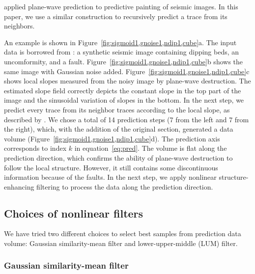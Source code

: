 \cite{Fomel08a} applied plane-wave prediction to predictive painting 
of seismic images. In this paper, we use a similar construction to
recursively predict a trace from its neighbors.

An example is shown in Figure~\ref{fig:sigmoid1,gnoise1,ndip1,cube}a.
The input data is borrowed from \cite{Claerbout08a}: a synthetic
seismic image containing dipping beds, an uncomformity, and a
fault. Figure~\ref{fig:sigmoid1,gnoise1,ndip1,cube}b shows the same
image with Gaussian noise
added. Figure~\ref{fig:sigmoid1,gnoise1,ndip1,cube}c shows local
slopes measured from the noisy image by plane-wave destruction. The
estimated slope field correctly depicts the constant slope in the top
part of the image and the sinusoidal variation of slopes in the
bottom. In the next step, we predict every trace from its neighbor
traces according to the local slope, as described by
\cite{Fomel08a}. We chose a total of 14 prediction steps (7 from the
left and 7 from the right), which, with the addition of the original
section, generated a data volume
(Figure~\ref{fig:sigmoid1,gnoise1,ndip1,cube}d). The prediction
axis corresponds to index $k$ in equation~\ref{eq:pred}. The volume
is flat along the prediction direction, which confirms the ability of
plane-wave destruction to follow the local
structure. However, it still contains some discontinuous information
because of the faults. In the next step, we apply nonlinear
structure-enhancing filtering to process the data along the prediction
direction.


  \subsection{Choices of nonlinear filters}

We have tried two different choices to select best samples from
prediction data volume: Gaussian similarity-mean filter and
lower-upper-middle (LUM) filter.

    \subsubsection{Gaussian similarity-mean filter}

